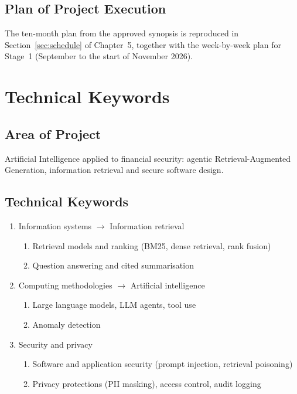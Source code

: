 \documentclass[oneside,a4paper,12pt]{report}
\begin{document}
\section{Plan of Project Execution}
The ten-month plan from the approved synopsis is reproduced in Section~\ref{sec:schedule} of Chapter~5, together with the week-by-week plan for Stage~1 (September to the start of November 2026).

\chapter{Technical Keywords}
\section{Area of Project}
Artificial Intelligence applied to financial security: agentic Retrieval-Augmented Generation, information retrieval and secure software design.

\section{Technical Keywords}
\begin{enumerate}[label=\arabic*.]
  \item Information systems $\rightarrow$ Information retrieval
  \begin{enumerate}[label=\arabic{enumi}.\arabic*]
    \item Retrieval models and ranking (BM25, dense retrieval, rank fusion)
    \item Question answering and cited summarisation
  \end{enumerate}
  \item Computing methodologies $\rightarrow$ Artificial intelligence
  \begin{enumerate}[label=\arabic{enumi}.\arabic*]
    \item Large language models, LLM agents, tool use
    \item Anomaly detection
  \end{enumerate}
  \item Security and privacy
  \begin{enumerate}[label=\arabic{enumi}.\arabic*]
    \item Software and application security (prompt injection, retrieval poisoning)
    \item Privacy protections (PII masking), access control, audit logging
  \end{enumerate}
\end{enumerate}
\end{document}
